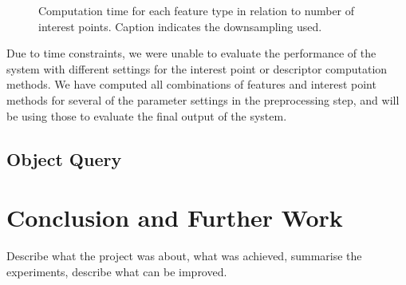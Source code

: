 \documentclass[11pt,a4paper]{kth-mag}
\begin{document}
\begin{figure}
  \caption{Computation time for each feature type in relation to number of
    interest points. Caption indicates the downsampling used.}
  \label{fig:feature_agg}
\end{figure}

Due to time constraints, we were unable to evaluate the performance of the
system with different settings for the interest point or descriptor computation
methods. We have computed all combinations of features and interest point
methods for several of the parameter settings in the preprocessing step, and
will be using those to evaluate the final output of the system.

\section{Object Query}

\label{queryexp}
\chapter{Conclusion and Further Work}
\label{chap:conc}
Describe what the project was about, what was achieved, summarise the
experiments, describe what can be improved.

\printbibliography
\end{document}
